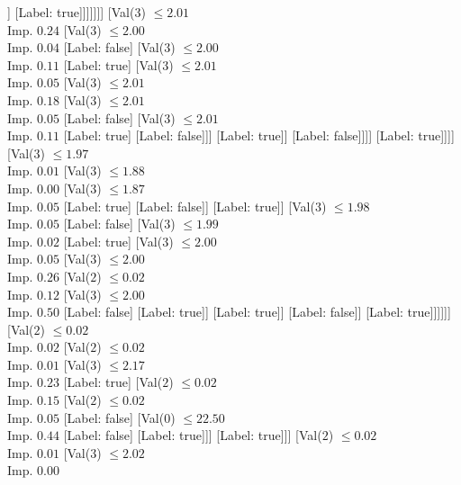 \documentclass[margin=10pt]{standalone}
\begin{document}
\begin{forest}
													]
												[Label: true]]]]]]]
						[Val($3$) $ \leq 2.01$ \\ Imp. $0.24$
							[Val($3$) $ \leq 2.00$ \\ Imp. $0.04$
								[Label: false]
								[Val($3$) $ \leq 2.00$ \\ Imp. $0.11$
									[Label: true]
									[Val($3$) $ \leq 2.01$ \\ Imp. $0.05$
										[Val($3$) $ \leq 2.01$ \\ Imp. $0.18$
											[Val($3$) $ \leq 2.01$ \\ Imp. $0.05$
												[Label: false]
												[Val($3$) $ \leq 2.01$ \\ Imp. $0.11$
													[Label: true]
													[Label: false]]]
											[Label: true]]
										[Label: false]]]]
							[Label: true]]]]
				[Val($3$) $ \leq 1.97$ \\ Imp. $0.01$
					[Val($3$) $ \leq 1.88$ \\ Imp. $0.00$
						[Val($3$) $ \leq 1.87$ \\ Imp. $0.05$
							[Label: true]
							[Label: false]]
						[Label: true]]
					[Val($3$) $ \leq 1.98$ \\ Imp. $0.05$
						[Label: false]
						[Val($3$) $ \leq 1.99$ \\ Imp. $0.02$
							[Label: true]
							[Val($3$) $ \leq 2.00$ \\ Imp. $0.05$
								[Val($3$) $ \leq 2.00$ \\ Imp. $0.26$
									[Val($2$) $ \leq 0.02$ \\ Imp. $0.12$
										[Val($3$) $ \leq 2.00$ \\ Imp. $0.50$
											[Label: false]
											[Label: true]]
										[Label: true]]
									[Label: false]]
								[Label: true]]]]]]
			[Val($2$) $ \leq 0.02$ \\ Imp. $0.02$
				[Val($2$) $ \leq 0.02$ \\ Imp. $0.01$
					[Val($3$) $ \leq 2.17$ \\ Imp. $0.23$
						[Label: true]
						[Val($2$) $ \leq 0.02$ \\ Imp. $0.15$
							[Val($2$) $ \leq 0.02$ \\ Imp. $0.05$
								[Label: false]
								[Val($0$) $ \leq 22.50$ \\ Imp. $0.44$
									[Label: false]
									[Label: true]]]
							[Label: true]]]
					[Val($2$) $ \leq 0.02$ \\ Imp. $0.01$
						[Val($3$) $ \leq 2.02$ \\ Imp. $0.00$

\end{forest}
\end{document}
